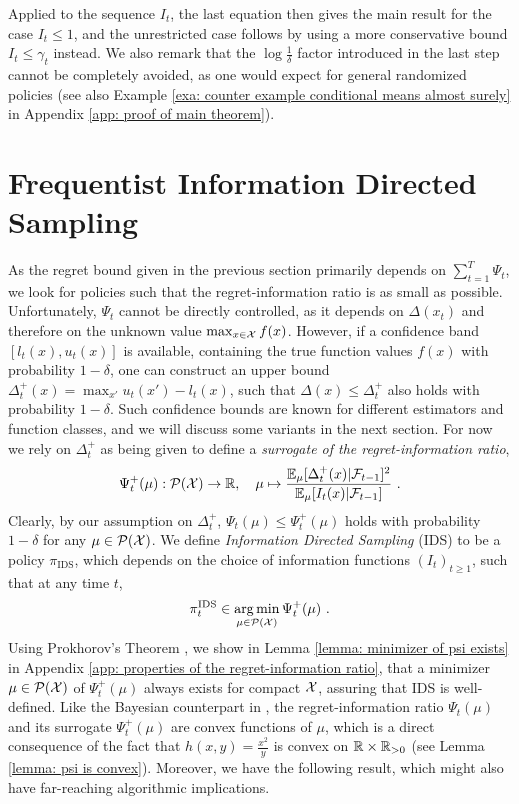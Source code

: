 Applied to the sequence $I_t$, the last equation then gives the main result for the case $I_t \leq 1$, and the unrestricted case follows by using a more conservative bound $I_t \leq \gamma_t$ instead. We also remark that the $\log\frac{1}{\delta}$ factor introduced in the last step cannot be completely avoided, as one would expect for general randomized policies (see also Example \ref{exa: counter example conditional means almost surely} in Appendix \ref{app: proof of main theorem}).

\pagebreak
\section{Frequentist Information Directed Sampling}\label{section: information directed sampling}
As the regret bound given in the previous section primarily depends on $\sum_{t=1}^T \Psi_t$, we look for policies such that the regret-information ratio is as small as possible. Unfortunately, $\Psi_t$ cannot be directly controlled, as it depends on $\Delta(x_t)$ and therefore on the unknown value $\max_{x \in \mathcal{X}} f(x)$. However, if a confidence band $[l_t(x), u_t(x)]$ is available, containing the true function values $f(x)$ with probability $1-\delta$, one can construct an upper bound $\Delta_t^+(x) =  \max_{x'} u_t(x') - l_t(x)$, such that $\Delta(x) \leq \Delta_t^+$ also holds with probability $1-\delta$. Such confidence bounds are known for different estimators and function classes, and we will discuss some variants in the next section. For now we rely on $\Delta_t^+$ as being given to define a \emph{surrogate of the regret-information ratio},
\begin{align*}
\Psi_t^+(\mu) : \mathcal{P}(\mathcal{X}) \rightarrow \mathbb{R}, \quad \mu \mapsto \frac{\mathbb{E}_\mu[\Delta_t^+(x) |\mathcal{F}_{t-1}]^2}{\mathbb{E}_\mu[I_t(x) | \mathcal{F}_{t-1}]} \text{ .}
\end{align*}
Clearly, by our assumption on $\Delta_t^+$, $\Psi_t(\mu) \leq \Psi_t^+(\mu)$ holds with probability $1-\delta$ for any $\mu \in \mathcal{P}(\mathcal{X})$. We define \emph{Information Directed Sampling} (IDS) to be a policy $\pi_{\text{IDS}}$, which depends on the choice of information functions $(I_t)_{t\geq1}$, such that at any time $t$,
\begin{align}
\pi_t^{\text{IDS}} \in \operatorname*{arg\,min}_{\mu \in \mathcal{P}(\mathcal{X})} \Psi_t^+(\mu) \text{ .}
\end{align}
Using Prokhorov's Theorem \cite[]{ProkhorovConvergenceRandomProcesses1956}, we show in Lemma \ref{lemma: minimizer of psi exists} in Appendix \ref{app: properties of the regret-information ratio}, that a minimizer $\mu \in \mathcal{P}(\mathcal{X})$ of $\Psi_t^+(\mu)$ always exists for compact $\mathcal{X}$, assuring that IDS is well-defined. Like the Bayesian counterpart in \citep{RussoLearningOptimizeInformationDirected2014}, the regret-information ratio $\Psi_t(\mu)$ and its surrogate  $\Psi_t^+(\mu)$ are convex functions of $\mu$, which is a direct consequence of the fact that $h(x,y) = \frac{x^2}{y}$ is convex on $\mathbb{R}\times \mathbb{R}_{> 0}$ (see Lemma \ref{lemma: psi is convex}). Moreover, we have the following result, which might also have far-reaching algorithmic implications.
